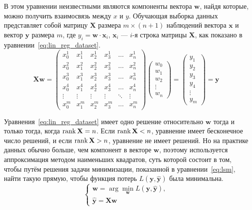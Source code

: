 В этом уравнении неизвестными являются компоненты вектора $\mathbf{w}$, найдя которые, можно получить взаимосвязь между $x$ и $y$. Обучающая выборка данных представляет собой матрицу $\mathbf{X}$ размера $m \times (n+1)$ наблюдений вектора $\mathbf{x}$ и вектор $\mathbf{y}$ размера $m$, где $y_i=\mathbf{w} \cdot \mathbf{x}_i$, $\mathbf{x}_i$ --- $i$-я строка матрицы $\mathbf{X}$, как показано в уравнении \ref*{eq:lin_reg_dataset}.
\begin{equation}
    \label{eq:lin_reg_dataset}
    \mathbf{X}\mathbf{w}=
    \left(\begin{matrix}
        x_0^1 & x_1^1 & x_2^1 & x_3^1 & \dots & x_n^1 \\
        x_0^2 & x_1^2 & x_2^2 & x_3^2 & \dots & x_n^2 \\
        x_0^3 & x_1^3 & x_2^3 & x_3^3 & \dots & x_n^3 \\
        x_0^4 & x_1^4 & x_2^4 & x_3^4 & \dots & x_n^4 \\
        \vdots & \vdots & \vdots & \vdots & \ddots & \vdots \\
        x_0^m & x_1^m & x_2^m & x_3^m & \dots & x_n^m
    \end{matrix}\right)
    \left(\begin{matrix}
        w_0 \\
        w_1 \\
        w_2 \\
        \vdots \\
        w_n
    \end{matrix}\right)=
    \left(\begin{matrix}
        y_1 \\
        y_2 \\
        y_3 \\
        y_4 \\
        \vdots \\
        y_m
    \end{matrix}\right)=\mathbf{y}
\end{equation}

Уравнения \ref*{eq:lin_reg_dataset} имеет одно решение относительно $\mathbf{w}$ тогда и только тогда, когда $\operatorname{rank} \mathbf{X} = n$. Если $\operatorname{rank} \mathbf{X} < n$, уравнение имеет бесконечное число решений, и если $\operatorname{rank} \mathbf{X} > n$, уравнение не имеет решений. Но на практике данных обычно больше, чем компонент в векторе $\mathbf{w}$, поэтому используется аппроксимация методом наименьших квадратов, суть которой состоит в том, чтобы путём решения задачи минимизации, показанной в уравнении \ref*{eq:lsm}, найти такую прямую, чтобы функция потерь $L(\mathbf{y},\hat{\mathbf{y}})$ была минимальна.
\begin{equation}
    \label{eq:lsm}
    \begin{cases}
        \mathbf{w} = \arg\min\limits_\mathbf{w} L(\mathbf{y},\hat{\mathbf{y}}), \\
        \hat{\mathbf{y}}=\mathbf{X}\mathbf{w}
    \end{cases}
\end{equation}

